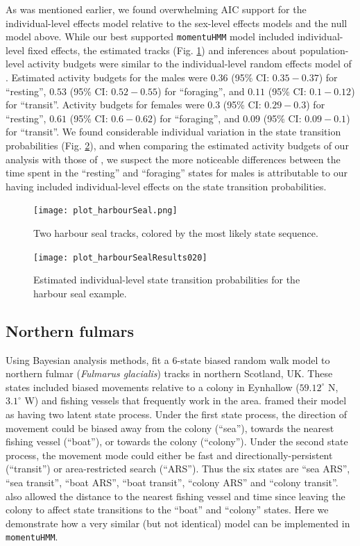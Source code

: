 \documentclass[12pt]{article}\usepackage[]{graphicx}\usepackage[]{xcolor}
\begin{document}
As was mentioned earlier, we found overwhelming AIC support for the individual-level effects model relative to the sex-level effects models and the null model above. While our best supported \verb|momentuHMM| model included individual-level fixed effects, the estimated tracks (Fig. \ref{fig:hsTracks}) and inferences about population-level activity budgets were similar to the individual-level random effects model of \cite{McClintockEtAl2013c}. Estimated activity budgets for the males were $0.36$ (95\% CI: $0.35-0.37$) for ``resting'', $0.53$ (95\% CI: $0.52-0.55$) for ``foraging'', and $0.11$ (95\% CI: $0.1-0.12$) for ``transit''.  Activity budgets for females were $0.3$ (95\% CI: $0.29-0.3$) for ``resting'', $0.61$ (95\% CI: $0.6-0.62$) for ``foraging'', and $0.09$ (95\% CI: $0.09-0.1$) for ``transit''. We found considerable individual variation in the state transition probabilities (Fig. \ref{fig:hsTPM}), and when comparing the estimated activity budgets of our analysis with those of \cite{McClintockEtAl2013c}, we suspect the more noticeable differences between the time spent in the ``resting'' and ``foraging'' states for males is attributable to our having included individual-level effects on the state transition probabilities.  
\begin{figure}[htbp]
  \centering
  \texttt{[image: plot\_harbourSeal.png]}
  \caption{Two harbour seal tracks, colored by the most likely state sequence.}
  \label{fig:hsTracks}
\end{figure}
\begin{figure}[htbp]
  \centering
  \texttt{[image: plot\_harbourSealResults020]}
  \caption{Estimated individual-level state transition probabilities for the harbour seal example.}
  \label{fig:hsTPM}
\end{figure}

\subsection{Northern fulmars}
\label{sec:northernFulmar}
Using Bayesian analysis methods, \cite{PirottaEtAl2018} fit a 6-state biased random walk model to northern fulmar ({\it Fulmarus glacialis}) tracks in northern Scotland, UK.  These states included biased movements relative to a colony in Eynhallow ($59.12^\circ$ N, $3.1^\circ$ W) and fishing vessels that frequently work in the area.  \cite{PirottaEtAl2018} framed their model as having two latent state process.  Under the first state process, the direction of movement could be biased away from the colony (``sea''), towards the nearest fishing vessel (``boat''), or towards the colony (``colony''). Under the second state process, the movement mode could either be fast and directionally-persistent (``transit'') or area-restricted search (``ARS'').  Thus the six states are ``sea ARS'', ``sea transit'', ``boat ARS'', ``boat transit'', ``colony ARS'' and ``colony transit''. \cite{PirottaEtAl2018} also allowed the distance to the nearest fishing vessel and time since leaving the colony to affect state transitions to the ``boat'' and ``colony'' states.  Here we demonstrate how a very similar (but not identical) model can be implemented in \verb|momentuHMM|.
\end{document}
